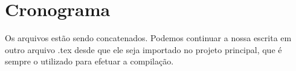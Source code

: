 \chapter{Cronograma}
\label{c.cronograma}

Os arquivos estão sendo concatenados. Podemos continuar a nossa escrita em outro arquivo .tex desde que ele seja importado no projeto principal, que é sempre o utilizado para efetuar a compilação.
